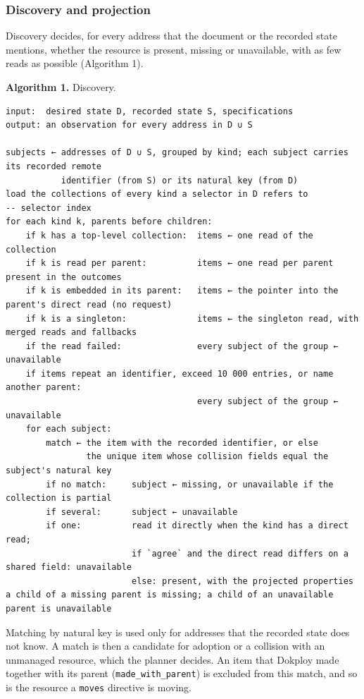\subsubsection*{Discovery and projection}

Discovery decides, for every address that the document or the recorded state mentions, whether the
resource is present, missing or unavailable, with as few reads as possible (Algorithm 1).

\textbf{Algorithm 1.} Discovery.

\begin{lstlisting}
input:  desired state D, recorded state S, specifications
output: an observation for every address in D ∪ S

subjects ← addresses of D ∪ S, grouped by kind; each subject carries its recorded remote
           identifier (from S) or its natural key (from D)
load the collections of every kind a selector in D refers to          -- selector index
for each kind k, parents before children:
    if k has a top-level collection:  items ← one read of the collection
    if k is read per parent:          items ← one read per parent present in the outcomes
    if k is embedded in its parent:   items ← the pointer into the parent's direct read (no request)
    if k is a singleton:              items ← the singleton read, with merged reads and fallbacks
    if the read failed:               every subject of the group ← unavailable
    if items repeat an identifier, exceed 10 000 entries, or name another parent:
                                      every subject of the group ← unavailable
    for each subject:
        match ← the item with the recorded identifier, or else
                the unique item whose collision fields equal the subject's natural key
        if no match:     subject ← missing, or unavailable if the collection is partial
        if several:      subject ← unavailable
        if one:          read it directly when the kind has a direct read;
                         if `agree` and the direct read differs on a shared field: unavailable
                         else: present, with the projected properties
a child of a missing parent is missing; a child of an unavailable parent is unavailable
\end{lstlisting}

Matching by natural key is used only for addresses that the recorded state does not know. A match is
then a candidate for adoption or a collision with an unmanaged resource, which the planner decides.
An item that Dokploy made together with its parent (\texttt{made\_with\_parent}) is excluded from this match,
and so is the resource a \texttt{moves} directive is moving.

